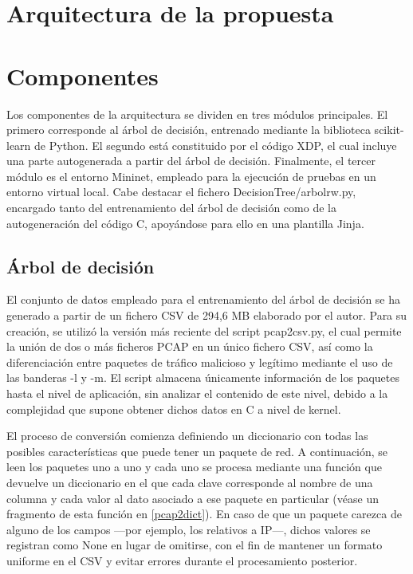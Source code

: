 \section{Arquitectura de la propuesta}

\section{Componentes}
Los componentes de la arquitectura se dividen en tres módulos principales. El primero corresponde al árbol de decisión, entrenado mediante la biblioteca scikit-learn de Python. El segundo está constituido por el código XDP, el cual incluye una parte autogenerada a partir del árbol de decisión. Finalmente, el tercer módulo es el entorno Mininet, empleado para la ejecución de pruebas en un entorno virtual local. Cabe destacar el fichero DecisionTree/arbolrw.py, encargado tanto del entrenamiento del árbol de decisión como de la autogeneración del código C, apoyándose para ello en una plantilla Jinja.

\subsection{Árbol de decisión}
El conjunto de datos empleado para el entrenamiento del árbol de decisión se ha generado a partir de un fichero CSV de 294,6 MB elaborado por el autor. Para su creación, se utilizó la versión más reciente del script pcap2csv.py, el cual permite la unión de dos o más ficheros PCAP en un único fichero CSV, así como la diferenciación entre paquetes de tráfico malicioso y legítimo mediante el uso de las banderas -l y -m. El script almacena únicamente información de los paquetes hasta el nivel de aplicación, sin analizar el contenido de este nivel, debido a la complejidad que supone obtener dichos datos en C a nivel de kernel.

El proceso de conversión comienza definiendo un diccionario con todas las posibles características que puede tener un paquete de red. A continuación, se leen los paquetes uno a uno y cada uno se procesa mediante una función que devuelve un diccionario en el que cada clave corresponde al nombre de una columna y cada valor al dato asociado a ese paquete en particular (véase un fragmento de esta función en \ref{pcap2dict}). En caso de que un paquete carezca de alguno de los campos —por ejemplo, los relativos a IP—, dichos valores se registran como None en lugar de omitirse, con el fin de mantener un formato uniforme en el CSV y evitar errores durante el procesamiento posterior.

